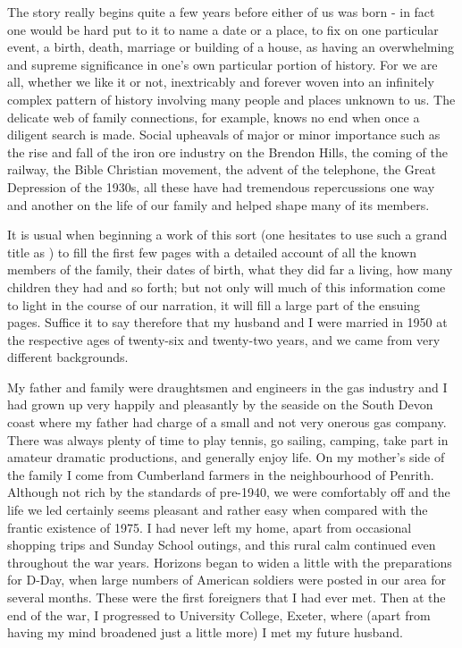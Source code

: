 
The story really begins quite a few years before either of us was born - in fact one would be hard put to it to name a date or a place, to fix on one particular event, a birth, death, marriage or building of a house, as having an overwhelming and supreme significance in one's own particular portion of history. For we are all, whether we like it or not, inextricably and forever woven into an infinitely complex pattern of history involving many people and places unknown to us. The delicate web of family connections, for example, knows no end when once a diligent search is made. Social upheavals of major or minor importance such as the rise and fall of the iron ore industry on the Brendon Hills, the coming of the railway, the Bible Christian movement, the advent of the telephone, the Great Depression of the 1930s, all these have had tremendous repercussions one way and another on the life of our family and helped shape many of its members.

It is usual when beginning a work of this sort (one hesitates to use such a grand title as ) to fill the first few pages with a detailed account of all the known members of the family, their dates of birth, what they did far a living, how many children they had and so forth; but not only will much of this information come to light in the course of our narration, it will fill a large part of the ensuing pages. Suffice it to say therefore that my husband and I were married in 1950 at the respective ages of twenty-six and twenty-two years, and we came from very different backgrounds.

My father and family were draughtsmen and engineers in the gas industry and I had grown up very happily and pleasantly by the seaside on the South Devon coast where my father had charge of a small and not very onerous gas company. There was always plenty of time to play tennis, go sailing, camping, take part in amateur dramatic productions, and generally enjoy life. On my mother's side of the family I come from Cumberland farmers in the neighbourhood of Penrith. Although not rich by the standards of pre-1940, we were comfortably off and the life we led certainly seems pleasant and rather easy when compared with the frantic existence of 1975. I had never left my home, apart from occasional shopping trips and Sunday School outings, and this rural calm continued even throughout the war years. Horizons began to widen a little with the preparations for D-Day, when large numbers of American soldiers were posted in our area for several months. These were the first foreigners that I had ever met.  Then at the end of the war, I progressed to University College, Exeter, where (apart from having my mind broadened just a little more) I met my future husband.

